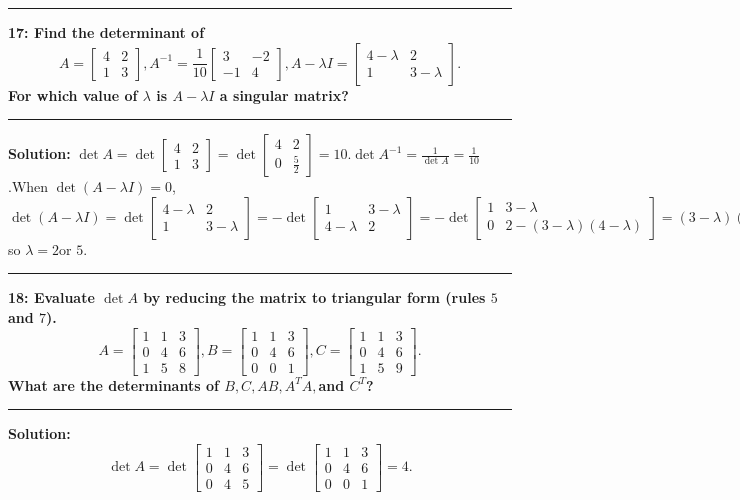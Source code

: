 \documentclass[11pt]{article}
\newcommand\question[2]{\vspace{.25in}\hrule\textbf{#1: #2}\vspace{.5em}\hrule\vspace{.10in}}
\newcommand\solution{\vspace{.10in}\textbf{Solution: }}
\begin{document}
\question{17}{Find the determinant of 
$$
A=
\begin{bmatrix}
  4&2\\
1&3
\end{bmatrix},A^{-1}=\frac{1}{10}
\begin{bmatrix}
  3&-2\\
-1&4
\end{bmatrix},A-\lambda I=
\begin{bmatrix}
  4-\lambda&2\\
1&3-\lambda
\end{bmatrix}.
$$
For which value of $\lambda$ is $A-\lambda I$ a singular matrix?
}
\solution $\det A=\det
\begin{bmatrix}
  4&2\\
1&3
\end{bmatrix}=\det
\begin{bmatrix}
  4&2\\
0&\frac{5}{2}
\end{bmatrix}=10
$.$\det A^{-1}=\frac{1}{\det A}=\frac{1}{10}$.When $\det (A-\lambda
I)=0$,
$$
\det (A-\lambda I)=\det
\begin{bmatrix}
  4-\lambda&2\\
1&3-\lambda
\end{bmatrix}=-\det
\begin{bmatrix}
  1&3-\lambda\\
4-\lambda&2
\end{bmatrix}=-\det
\begin{bmatrix}
  1&3-\lambda\\
 0&2-(3-\lambda)(4-\lambda)
\end{bmatrix}=(3-\lambda)(4-\lambda)-2=0,
$$
so $\lambda=2$or $5$.
\question{18}{Evaluate $\det A$ by reducing the matrix to triangular
  form (rules $5$ and $7$).
$$
A=
\begin{bmatrix}
  1&1&3\\
0&4&6\\
1&5&8
\end{bmatrix},B=
\begin{bmatrix}
  1&1&3\\
0&4&6\\
0&0&1
\end{bmatrix},C=
\begin{bmatrix}
  1&1&3\\
0&4&6\\
1&5&9
\end{bmatrix}.
$$
What are the determinants of $B,C,AB,A^TA,$and $C^T$?
}
\solution 
$$
\det A=\det
\begin{bmatrix}
  1&1&3\\
  0&4&6\\
  0&4&5
\end{bmatrix}=\det
\begin{bmatrix}
  1&1&3\\
0&4&6\\
0&0&1
\end{bmatrix}=4.
$$
\end{document}
